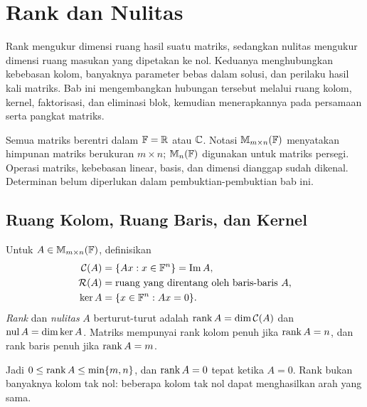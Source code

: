 \chapter{Rank dan Nulitas}
\label{ch:rank}

Rank mengukur dimensi ruang hasil suatu matriks, sedangkan nulitas
mengukur dimensi ruang masukan yang dipetakan ke nol. Keduanya
menghubungkan kebebasan kolom, banyaknya parameter bebas dalam solusi,
dan perilaku hasil kali matriks. Bab ini mengembangkan hubungan tersebut
melalui ruang kolom, kernel, faktorisasi, dan eliminasi blok, kemudian
menerapkannya pada persamaan serta pangkat matriks.

Semua matriks berentri dalam $\mathbb{F}=\mathbb{R}$ atau $\mathbb{C}$.
Notasi $\mathbb{M}_{m\times n}(\mathbb{F})$ menyatakan himpunan matriks berukuran
$m\times n$; $\mathbb{M}_n(\mathbb{F})$ digunakan untuk matriks persegi.
Operasi matriks, kebebasan linear, basis, dan dimensi dianggap sudah dikenal.
Determinan belum diperlukan dalam pembuktian-pembuktian bab ini.

\section{Ruang Kolom, Ruang Baris, dan Kernel}
\label{rank:dasar}

\begin{definisi}
    Untuk $A\in\mathbb{M}_{m\times n}(\mathbb{F})$, definisikan
    \[
        \begin{aligned}
            \mathcal C(A)&=\{Ax:x\in\mathbb{F}^n\}=\operatorname{Im}A,\\
            \mathcal R(A)&=\text{ruang yang direntang oleh baris-baris }A,\\
            \ker A&=\{x\in\mathbb{F}^n:Ax=0\}.
        \end{aligned}
    \]
    \emph{Rank} dan \emph{nulitas} $A$ berturut-turut adalah
    $\operatorname{rank} A=\dim\mathcal C(A)$ dan $\operatorname{nul} A=\dim\ker A$.
    Matriks mempunyai rank kolom penuh jika $\operatorname{rank} A=n$, dan rank baris
    penuh jika $\operatorname{rank} A=m$.
\end{definisi}

Jadi $0\le\operatorname{rank} A\le\min\{m,n\}$, dan $\operatorname{rank} A=0$ tepat ketika $A=0$.
Rank bukan banyaknya kolom tak nol: beberapa kolom tak nol dapat
menghasilkan arah yang sama.

